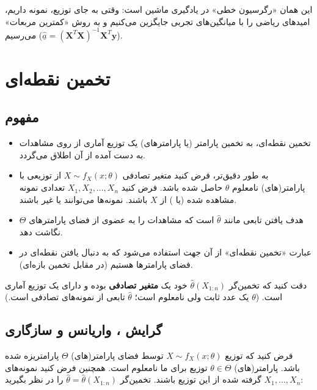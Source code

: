\begin{note}
\notetitle این همان «رگرسیون خطی» در یادگیری ماشین است: وقتی به جای توزیع، نمونه داریم، امیدهای ریاضی را با میانگین‌های تجربی جایگزین می‌کنیم و به روش «کمترین مربعات» ($\hat{\underline a}=(\mathbf X^T\mathbf X)^{-1}\mathbf X^T\mathbf y$) می‌رسیم.
\end{note}

\section{تخمین نقطه‌ای }

\subsection{مفهوم}
\begin{itemize}
\item تخمین نقطه‌ای، به تخمین پارامتر (یا پارامترهای) یک توزیع آماری از روی مشاهدات به دست آمده از آن اطلاق می‌گردد.
\item به طور دقیق‌تر، فرض کنید متغیر تصادفی $X\sim f_X(x;\theta)$ از توزیعی با پارامتر(های) نامعلوم $\theta$ حاصل شده باشد. فرض کنید $X_1,X_2,\ldots,X_n$ تعدادی نمونه مشاهده شده (یا ) از $X$ باشند. نمونه‌ها می‌توانند  یا غیر  باشند.
\item هدف یافتن تابعی مانند $\hat\theta$ است که مشاهدات را به عضوی از فضای پارامترهای $\Theta$ نگاشت دهد.
\item عبارت «تخمین نقطه‌ای» از آن جهت استفاده می‌شود که به دنبال یافتن نقطه‌ای در فضای پارامترها هستیم (در مقابل تخمین بازه‌ای).
\end{itemize}

\begin{warning}
\warntitle دقت کنید که تخمین‌گر $\hat\theta(X_{1:n})$ خود یک \textbf{متغیر تصادفی} بوده و دارای یک توزیع آماری است. ($\theta$ یک عدد ثابت ولی نامعلوم است؛ $\hat\theta$ تابعی از نمونه‌های تصادفی است.)
\end{warning}

\subsection{گرایش ، واریانس  و سازگاری }
فرض کنید که توزیع $X\sim f_X(x;\theta)$ توسط فضای پارامتر(های) $\Theta$ پارامتریزه شده باشد. پارامتر(های) $\theta\in\Theta$ توزیع برای ما نامعلوم است. همچنین فرض کنید نمونه‌های $X_1,\ldots,X_n$  گرفته شده از این توزیع باشند. تخمین‌گر $\hat\theta=\hat\theta(X_{1:n})$ را در نظر بگیرید:

